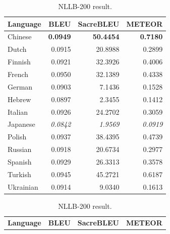 \documentclass[a4paper]{article}
\begin{document}
\begin{table}[htbp]
    \centering
    \begin{minipage}{0.49\linewidth}
        \footnotesize
        \begin{tabular}{|l|r|r|r|}
            \hline
            \textbf{Language} & \textbf{BLEU}   & \textbf{SacreBLEU} & \textbf{METEOR} \\
            \hline
            Chinese           & \textbf{0.0949} & \textbf{50.4454}   & \textbf{0.7180} \\
            Dutch             & 0.0915          & 20.8988            & 0.2899          \\
            Finnish           & 0.0921          & 32.3926            & 0.4006          \\
            French            & 0.0950          & 32.1389            & 0.4338          \\
            German            & 0.0903          & 7.1436             & 0.1528          \\
            Hebrew            & 0.0897          & 2.3455             & 0.1412          \\
            Italian           & 0.0926          & 24.2702            & 0.3059          \\
            Japanese          & \textit{0.0842} & \textit{1.9569}    & \textit{0.0919} \\
            Polish            & 0.0937          & 38.4395            & 0.4739          \\
            Russian           & 0.0918          & 20.6734            & 0.2977          \\
            Spanish           & 0.0929          & 26.3313            & 0.3578          \\
            Turkish           & 0.0945          & 45.2721            & 0.6187          \\
            Ukrainian         & 0.0914          & 9.0340             & 0.1613          \\
            \hline
        \end{tabular}
        \caption{NLLB-200 result.}
        \label{table:nllb_result}
    \end{minipage}
    \begin{minipage}{0.49\linewidth}
        \footnotesize
        \begin{tabular}{|l|r|r|r|}
            \hline
            \textbf{Language} & \textbf{BLEU}   & \textbf{SacreBLEU} & \textbf{METEOR} \\

\end{tabular}
\end{minipage}
\end{table}
\end{document}
